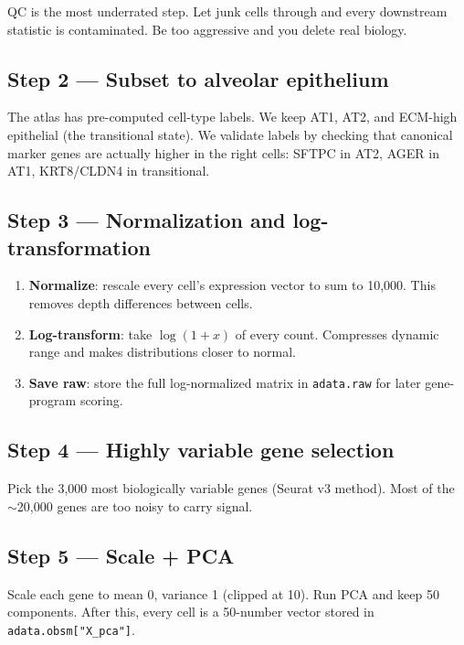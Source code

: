 \documentclass[11pt]{article}
\begin{document}
\begin{whyblock}
QC is the most underrated step. Let junk cells through and every downstream statistic is contaminated. Be too aggressive and you delete real biology.
\end{whyblock}

\subsection{Step 2 --- Subset to alveolar epithelium}

The atlas has pre-computed cell-type labels. We keep AT1, AT2, and ECM-high epithelial (the transitional state). We validate labels by checking that canonical marker genes are actually higher in the right cells: SFTPC in AT2, AGER in AT1, KRT8/CLDN4 in transitional.

\subsection{Step 3 --- Normalization and log-transformation}

\begin{enumerate}
\item \textbf{Normalize}: rescale every cell's expression vector to sum to 10{,}000. This removes depth differences between cells.
\item \textbf{Log-transform}: take $\log(1+x)$ of every count. Compresses dynamic range and makes distributions closer to normal.
\item \textbf{Save raw}: store the full log-normalized matrix in \texttt{adata.raw} for later gene-program scoring.
\end{enumerate}

\subsection{Step 4 --- Highly variable gene selection}

Pick the 3{,}000 most biologically variable genes (Seurat v3 method). Most of the $\sim$20{,}000 genes are too noisy to carry signal.

\subsection{Step 5 --- Scale + PCA}

Scale each gene to mean 0, variance 1 (clipped at 10). Run PCA and keep 50 components. After this, every cell is a 50-number vector stored in \texttt{adata.obsm["X\_pca"]}.
\end{document}
